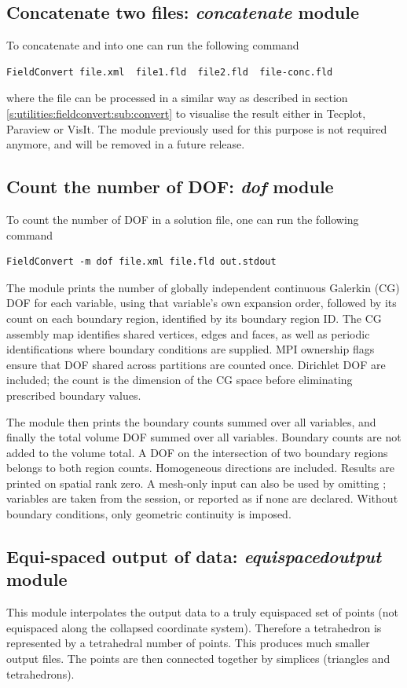 \subsection{Concatenate two files: \textit{concatenate} module}
To concatenate  and  into 
one can run the following command
%
\begin{lstlisting}[style=BashInputStyle]
FieldConvert file.xml  file1.fld  file2.fld  file-conc.fld
\end{lstlisting}
%
where the file  can be processed in a similar
way as described in section \ref{s:utilities:fieldconvert:sub:convert}
to visualise the result either in Tecplot, Paraview or VisIt. The
 module previously used for this purpose is not
required anymore, and will be removed in a future release.
%
%
%
\subsection{Count the number of DOF: \textit{dof} module}
To count the number of DOF in a solution file,
one can run the following command
%
\begin{lstlisting}[style=BashInputStyle]
FieldConvert -m dof file.xml file.fld out.stdout
\end{lstlisting}
The module prints the number of globally independent continuous Galerkin
(CG) DOF for each variable, using that variable's own expansion order,
followed by its count on each boundary region, identified by its boundary
region ID. The CG assembly map identifies shared vertices, edges and faces,
as well as periodic identifications where boundary conditions are supplied.
MPI ownership flags ensure that DOF shared across partitions are counted
once. Dirichlet DOF are included; the count is the dimension of the CG space
before eliminating prescribed boundary values.

The module then prints the boundary counts summed over all variables, and
finally the total volume DOF summed over all variables. Boundary counts are
not added to the volume total. A DOF on the intersection of two boundary
regions belongs to both region counts. Homogeneous directions are included.
Results are printed on spatial rank zero. A mesh-only input can also be
used by omitting ; variables are taken from the session, or
reported as  if none are declared. Without boundary
conditions, only geometric continuity is imposed.
%
%
%
\subsection{Equi-spaced output of data: \textit{equispacedoutput} module}
This module interpolates the output data to a truly equispaced set of
points (not equispaced along the collapsed coordinate
system). Therefore a tetrahedron is represented by a tetrahedral
number of points. This produces much smaller output files. The points
are then connected together by simplices (triangles and tetrahedrons).

